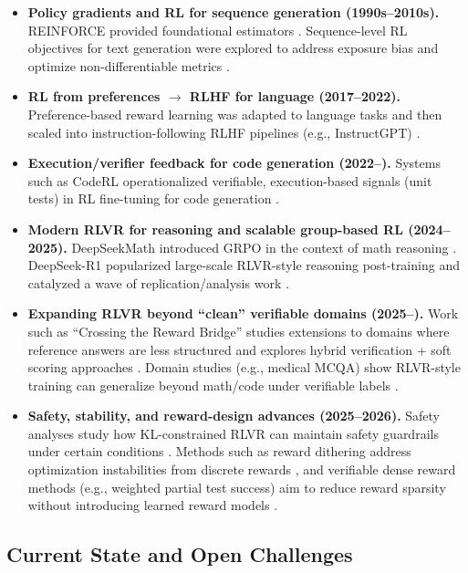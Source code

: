 \documentclass[10pt]{article}
\begin{document}
\begin{itemize}
  \item \textbf{Policy gradients and RL for sequence generation (1990s--2010s).}
  REINFORCE provided foundational estimators \cite{williams1992reinforce}.
  Sequence-level RL objectives for text generation were explored to address exposure bias and optimize non-differentiable metrics \cite{ranzato2016sequence,paulus2018summarization}.
  \item \textbf{RL from preferences $\rightarrow$ RLHF for language (2017--2022).}
  Preference-based reward learning \cite{christiano2017preferences} was adapted to language tasks \cite{ziegler2019finetuning,stiennon2020summarize} and then scaled into instruction-following RLHF pipelines (e.g., InstructGPT) \cite{ouyang2022instructgpt}.
  \item \textbf{Execution/verifier feedback for code generation (2022--).}
  Systems such as CodeRL operationalized verifiable, execution-based signals (unit tests) in RL fine-tuning for code generation \cite{le2022coderl}.
  \item \textbf{Modern RLVR for reasoning and scalable group-based RL (2024--2025).}
  DeepSeekMath introduced GRPO in the context of math reasoning \cite{deepseekai2024deepseekmath}.
  DeepSeek-R1 popularized large-scale RLVR-style reasoning post-training and catalyzed a wave of replication/analysis work \cite{guo2025deepseekr1,wen2025rlvr,mroueh2025grpo}.
  \item \textbf{Expanding RLVR beyond ``clean'' verifiable domains (2025--).}
  Work such as ``Crossing the Reward Bridge'' studies extensions to domains where reference answers are less structured and explores hybrid verification + soft scoring approaches \cite{su2025crossingrewardbridge}.
  Domain studies (e.g., medical MCQA) show RLVR-style training can generalize beyond math/code under verifiable labels \cite{zhang2025medrlvr}.
  \item \textbf{Safety, stability, and reward-design advances (2025--2026).}
  Safety analyses study how KL-constrained RLVR can maintain safety guardrails under certain conditions \cite{cho2025safetycapability}.
  Methods such as reward dithering address optimization instabilities from discrete rewards \cite{wei2025redit}, and verifiable dense reward methods (e.g., weighted partial test success) aim to reduce reward sparsity without introducing learned reward models \cite{wang2026verpo}.
\end{itemize}

\subsection{Current State and Open Challenges}
\end{document}
